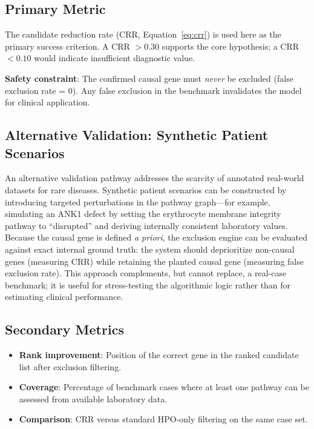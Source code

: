 \documentclass[12pt,a4paper]{article}
\begin{document}
\subsection{Primary Metric}

The candidate reduction rate (CRR, Equation~\eqref{eq:crr}) is used here as the primary success criterion. A CRR $> 0.30$ supports the core hypothesis; a CRR $< 0.10$ would indicate insufficient diagnostic value.

\textbf{Safety constraint}: The confirmed causal gene must \emph{never} be excluded (false exclusion rate = 0). Any false exclusion in the benchmark invalidates the model for clinical application.

\subsection{Alternative Validation: Synthetic Patient Scenarios}

An alternative validation pathway addresses the scarcity of annotated real-world datasets for rare diseases. Synthetic patient scenarios can be constructed by introducing targeted perturbations in the pathway graph---for example, simulating an ANK1 defect by setting the erythrocyte membrane integrity pathway to ``disrupted'' and deriving internally consistent laboratory values. Because the causal gene is defined \emph{a priori}, the exclusion engine can be evaluated against exact internal ground truth: the system should deprioritize non-causal genes (measuring CRR) while retaining the planted causal gene (measuring false exclusion rate). This approach complements, but cannot replace, a real-case benchmark; it is useful for stress-testing the algorithmic logic rather than for estimating clinical performance.

\subsection{Secondary Metrics}

\begin{itemize}
    \item \textbf{Rank improvement}: Position of the correct gene in the ranked candidate list after exclusion filtering.
    \item \textbf{Coverage}: Percentage of benchmark cases where at least one pathway can be assessed from available laboratory data.
    \item \textbf{Comparison}: CRR versus standard HPO-only filtering on the same case set.
\end{itemize}
\end{document}
